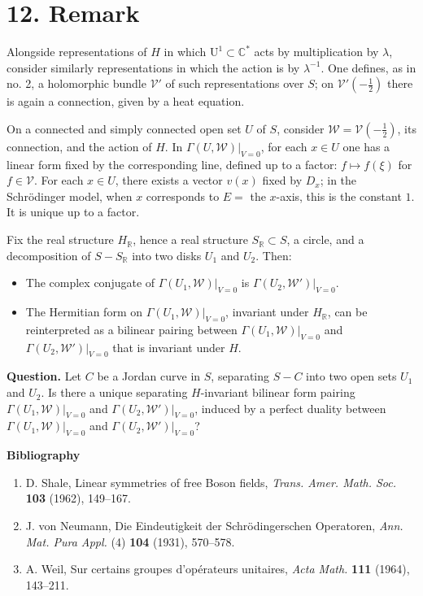 \documentclass[12pt,a4paper]{article}
\theoremstyle{plain}
\theoremstyle{definition}
\theoremstyle{remark}
\begin{document}
\section*{12. Remark}

Alongside representations of $H$ in which $\mathrm U^1\subset \mathbb C^*$ acts by multiplication by $\lambda$, consider similarly representations in which the action is by $\lambda^{-1}$. One defines, as in no. 2, a holomorphic bundle $\mathscr V'$ of such representations over $S$; on $\mathscr V'(-\frac12)$ there is again a connection, given by a heat equation.

On a connected and simply connected open set $U$ of $S$, consider $\mathscr W=\mathscr V(-\frac12)$, its connection, and the action of $H$. In $\Gamma(U,\mathscr W)|_{V=0}$, for each $x\in U$ one has a linear form fixed by the corresponding line, defined up to a factor: $f\mapsto f(\xi)$ for $f\in \mathscr V$. For each $x\in U$, there exists a vector $v(x)$ fixed by $D_x$; in the Schrödinger model, when $x$ corresponds to $E=$ the $x$-axis, this is the constant $1$. It is unique up to a factor.

Fix the real structure $H_{\mathbb R}$, hence a real structure $S_{\mathbb R}\subset S$, a circle, and a decomposition of $S-S_{\mathbb R}$ into two disks $U_1$ and $U_2$. Then:
\begin{itemize}
\item[(a)] The complex conjugate of $\Gamma(U_1,\mathscr W)|_{V=0}$ is $\Gamma(U_2,\mathscr W')|_{V=0}$.
\item[(b)] The Hermitian form on $\Gamma(U_1,\mathscr W)|_{V=0}$, invariant under $H_{\mathbb R}$, can be reinterpreted as a bilinear pairing between $\Gamma(U_1,\mathscr W)|_{V=0}$ and $\Gamma(U_2,\mathscr W')|_{V=0}$ that is invariant under $H$.
\end{itemize}

\medskip
\noindent\textbf{Question.} Let $C$ be a Jordan curve in $S$, separating $S-C$ into two open sets $U_1$ and $U_2$. Is there a unique separating $H$-invariant bilinear form pairing $\Gamma(U_1,\mathscr W)|_{V=0}$ and $\Gamma(U_2,\mathscr W')|_{V=0}$, induced by a perfect duality between $\Gamma(U_1,\mathscr W)|_{V=0}$ and $\Gamma(U_2,\mathscr W')|_{V=0}$?

\vspace{2em}

\noindent\textbf{Bibliography}

\begin{enumerate}[label={\arabic*.}]
\item D. Shale, Linear symmetries of free Boson fields, \textit{Trans. Amer. Math. Soc.} \textbf{103} (1962), 149--167.
\item J. von Neumann, Die Eindeutigkeit der Schrödingerschen Operatoren, \textit{Ann. Mat. Pura Appl.} (4) \textbf{104} (1931), 570--578.
\item A. Weil, Sur certains groupes d'opérateurs unitaires, \textit{Acta Math.} \textbf{111} (1964), 143--211.
\end{enumerate}
\end{document}
